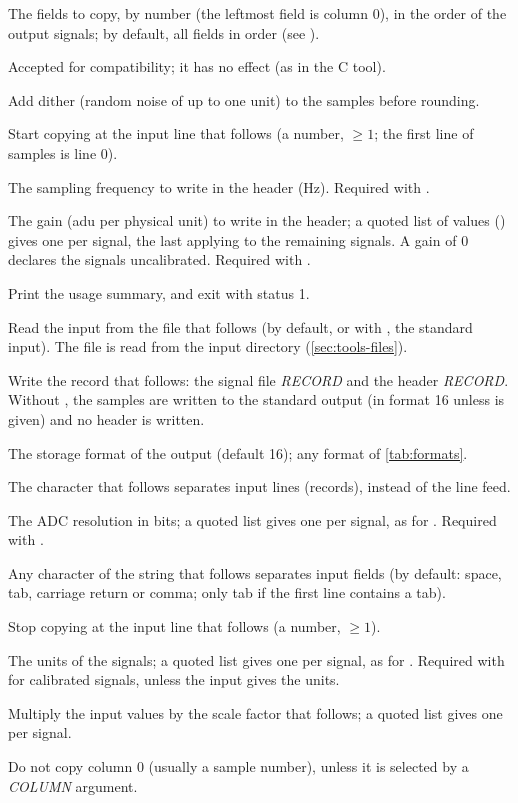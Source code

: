 \begin{params}
\item[COLUMN] The fields to copy, by number (the leftmost field is column 0), in the order
  of the output signals; by default, all fields in order (see ).
\item[-c] Accepted for compatibility; it has no effect (as in the C tool).
\item[-d] Add dither (random noise of up to one unit) to the samples before rounding.
\item[-f] Start copying at the input line that follows (a number, $\ge 1$; the first line
  of samples is line 0).
\item[-F] The sampling frequency to write in the header (Hz). Required with .
\item[-G] The gain (adu per physical unit) to write in the header; a quoted list of values
  () gives one per signal, the last applying to the remaining signals. A
  gain of 0 declares the signals uncalibrated. Required with .
\item[-h] Print the usage summary, and exit with status 1.
\item[-i] Read the input from the file that follows (by default, or with \code{-}, the
  standard input). The file is read from the input directory (\cref{sec:tools-files}).
\item[-o] Write the record that follows: the signal file \textit{RECORD} and the
  header \textit{RECORD}. Without , the samples are written to the
  standard output (in format 16 unless  is given) and no header is written.
\item[-O] The storage format of the output (default 16); any format of
  \cref{tab:formats}.
\item[-r] The character that follows separates input lines (records), instead of the
  line feed.
\item[-R] The ADC resolution in bits; a quoted list gives one per signal, as for .
  Required with .
\item[-s] Any character of the string that follows separates input fields (by default:
  space, tab, carriage return or comma; only tab if the first line contains a tab).
\item[-t] Stop copying at the input line that follows (a number, $\ge 1$).
\item[-U] The units of the signals; a quoted list gives one per signal, as for .
  Required with  for calibrated signals, unless the input gives the units.
\item[-x] Multiply the input values by the scale factor that follows; a quoted list gives
  one per signal.
\item[-z] Do not copy column 0 (usually a sample number), unless it is selected by a
  \textit{COLUMN} argument.
\end{params}

